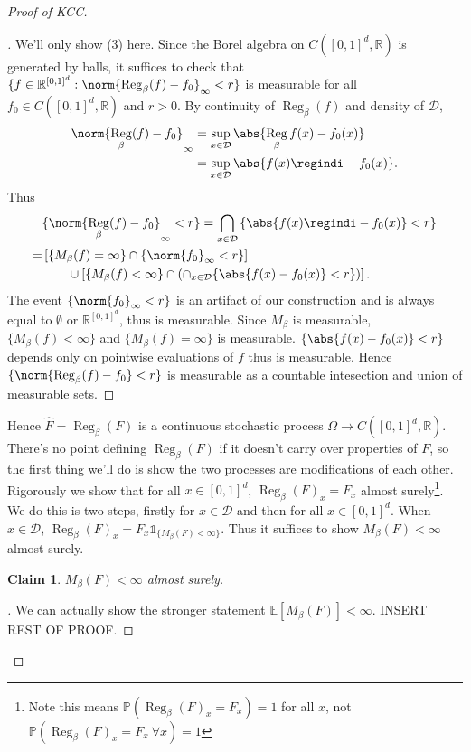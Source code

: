 \documentclass[fontsize=12pt, DIV=10]{scrreprt}
\newtheorem{claim}{Claim}
\theoremstyle{remark}
\newenvironment{subproof}[1][\proofname]{%
  \renewcommand{\qedsymbol}{$\blacksquare$}%
  \begin{proof}[#1]%
}{%
  \end{proof}%
}
\newcommand{\R}{\mathbb R}
\newcommand{\E}{\mathbb E}
\newcommand{\prob}{\mathbb P}
\newcommand{\indi}{\mathbb 1}
\newcommand{\calD}{\mathcal D}
\DeclareMathOperator{\reg}{Reg}
\newcommand{\boxspace}{\ensuremath{\R^{[0, 1]^d}}}
\newcommand{\unitbox}{\ensuremath{[0,1]^d}}
\begin{document}
\begin{proof}[Proof of KCC]
	\begin{subproof}
	We'll only show (3) here. Since the Borel algebra on $C([0, 1]^d, \R)$ is generated by balls, it suffices to check that $\{f \in \boxspace : \norm{\reg_{\beta}(f) - f_0}_{\infty} < r\}$ is measurable for all $f_0 \in C([0, 1]^d, \R)$ and $r > 0$. By continuity of $\reg_{\beta}(f)$ and density of $\calD$,
	\begin{align}
		\norm{\reg_{\beta}(f) - f_0}_{\infty}
		&= \sup_{x \in \calD} \abs{\reg_{\beta}f(x) - f_0(x)} \\
		&= \sup_{x \in \calD} \abs{f(x) \regindi - f_0(x)}.
	\end{align}
	Thus
	\begin{align}
		&\{\norm{\reg_{\beta}(f) - f_0}_{\infty} < r\}
		= \bigcap_{x \in \calD} \left\{ \abs{f(x) \regindi - f_0(x)} < r \right\} \\
		=& \left[ \{M_{\beta}(f) = \infty\} \cap \{\norm{f_0}_{\infty} < r\} \right] \nonumber \\
		 & \qquad \cup \left[ \{M_{\beta}(f) < \infty\} \cap \left( \cap_{x \in \calD} \{\abs{f(x) - f_0(x)} < r\} \right) \right].
	\end{align}
	The event $\{\norm{f_0}_{\infty} < r\}$ is an artifact of our construction and is always equal to $\emptyset$ or $\boxspace$, thus is measurable. Since $M_{\beta}$ is measurable, $\{M_{\beta}(f) < \infty\}$ and $\{M_{\beta}(f) = \infty\}$ is measurable. $\{\abs{f(x) - f_0(x)} < r\}$ depends only on pointwise evaluations of $f$ thus is measurable. Hence $\{\norm{\reg_{\beta}(f) - f_0} < r\}$ is measurable as a countable intesection and union of measurable sets.
	\end{subproof}

	Hence $\hat{F} = \reg_{\beta}(F)$ is a continuous stochastic process $\Omega \to C(\unitbox, \R)$. There's no point defining $\reg_{\beta}(F)$ if it doesn't carry over properties of $F$, so the first thing we'll do is show the two processes are modifications of each other. Rigorously we show that for all $x \in [0, 1]^d$, $\reg_{\beta}(F)_x = F_x$ almost surely\footnote{Note this means $\prob(\reg_{\beta}(F)_x = F_x) = 1$ for all $x$, not $\prob(\reg_{\beta}(F)_x = F_x \ \forall x) = 1$}. We do this is two steps, firstly for $x \in \calD$ and then for all $x \in [0, 1]^d$. When $x \in \calD$, $\reg_{\beta}(F)_x = F_x \indi_{\{M_{\beta}(F) < \infty\}}$. Thus it suffices to show $M_{\beta}(F) < \infty$ almost surely.
	\begin{claim}
		$M_{\beta}(F) < \infty$ almost surely.
	\end{claim}
	\begin{subproof}
		We can actually show the stronger statement $\E[M_{\beta}(F)] < \infty$. INSERT REST OF PROOF.
	\end{subproof}
	

\end{proof}
\end{document}
